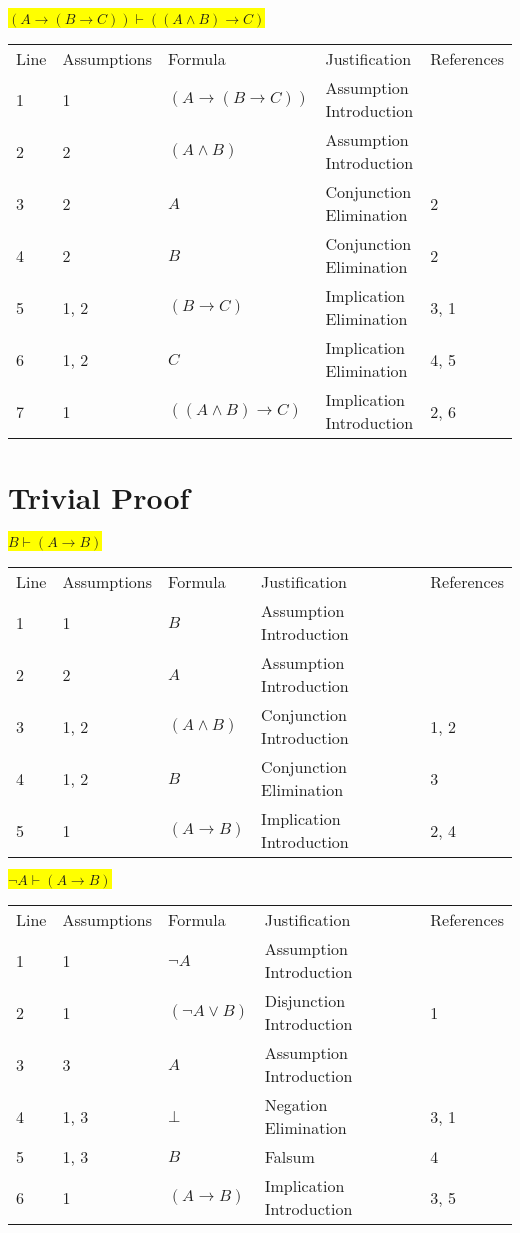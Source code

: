 \documentclass[12pt]{article}
\newcommand{\pr}[1]{\bigbreak \colorbox{Yellow}{$#1$} \smallbreak}
\begin{document}
\begin{flushleft}
\pr{(A \rightarrow (B \rightarrow C)) \vdash ((A \land B) \rightarrow C)}
\begin{tabular}{lllll}
    Line & Assumptions & Formula & Justification & References \\
    1 & 1 & $(A\rightarrow (B\rightarrow C))$  & Assumption Introduction &  \\
    2 & 2 & $(A\land B)$  & Assumption Introduction &  \\
    3 & 2 & $A$  & Conjunction Elimination & 2 \\
    4 & 2 & $B$  & Conjunction Elimination & 2 \\
    5 & 1, 2 & $(B\rightarrow C)$  & Implication Elimination & 3, 1 \\
    6 & 1, 2 & $C$  & Implication Elimination & 4, 5 \\
    7 & 1 & $((A\land B)\rightarrow C)$  & Implication Introduction & 2, 6 \\
\end{tabular}

\section{Trivial Proof}
\pr{B \vdash (A \rightarrow B)}
\begin{tabular}{lllll}
    Line & Assumptions & Formula & Justification & References \\
    1 & 1 & $B$  & Assumption Introduction &  \\
    2 & 2 & $A$  & Assumption Introduction &  \\
    3 & 1, 2 & $(A\land B)$  & Conjunction Introduction & 1, 2 \\
    4 & 1, 2 & $B$  & Conjunction Elimination & 3 \\
    5 & 1 & $(A\rightarrow B)$  & Implication Introduction & 2, 4 \\
\end{tabular}

\pr{\neg A \vdash (A \rightarrow B)}
\begin{tabular}{lllll}
    Line & Assumptions & Formula & Justification & References \\
    1 & 1 & $\neg A$  & Assumption Introduction &  \\
    2 & 1 & $(\neg A\lor B)$  & Disjunction Introduction & 1 \\
    3 & 3 & $A$  & Assumption Introduction &  \\
    4 & 1, 3 & $\bot $  & Negation Elimination & 3, 1 \\
    5 & 1, 3 & $B$  & Falsum & 4 \\
    6 & 1 & $(A\rightarrow B)$  & Implication Introduction & 3, 5 \\
\end{tabular}


\end{flushleft}
\end{document}
